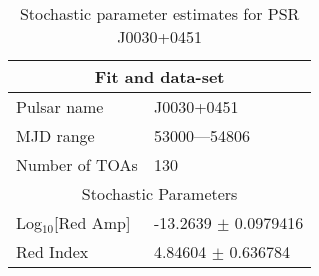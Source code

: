 \documentclass{article}
\begin{document}
\begin{table*}
\caption{Stochastic parameter estimates for PSR J0030+0451}
\begin{tabular}{ll}
\hline\hline
\multicolumn{2}{c}{Fit and data-set} \\ 
\hline
Pulsar name\dotfill & J0030+0451 \\ 
MJD range\dotfill & 53000---54806 \\ 
Number of TOAs\dotfill & 130 \\
\hline
\multicolumn{2}{c}{Stochastic Parameters} \\ 
\hline
Log$_{10}$[Red Amp] \dotfill & -13.2639 $\pm$ 0.0979416  \\ 
Red Index \dotfill & 4.84604 $\pm$ 0.636784  \\ 
\hline
\end{tabular}
\label{Table:J0030+0451}
\end{table*} 
\end{document}
